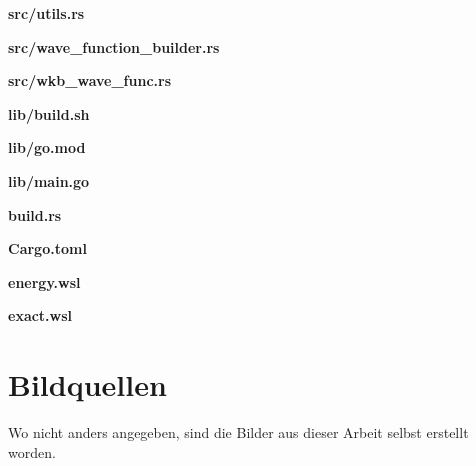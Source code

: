 \documentclass[11pt,DIV=10,final]{scrreprt} %
\begin{document}
\begin{appendix}
\vspace*{3ex}
{\noindent \large \bfseries src/utils.rs}


\vspace*{3ex}
{\noindent \large \bfseries src/wave\_function\_builder.rs}


\vspace*{3ex}
{\noindent \large \bfseries src/wkb\_wave\_func.rs}


\vspace*{3ex}
{\noindent \large \bfseries lib/build.sh}


\vspace*{3ex}
{\noindent \large \bfseries lib/go.mod}


\vspace*{3ex}
{\noindent \large \bfseries lib/main.go}


\vspace*{3ex}
{\noindent \large \bfseries build.rs}


\vspace*{3ex}
{\noindent \large \bfseries Cargo.toml}


\vspace*{3ex}
{\noindent \large \bfseries energy.wsl}


\vspace*{3ex}
{\noindent \large \bfseries exact.wsl}


\end{appendix}
\chapter*{Bildquellen}
%
Wo nicht anders angegeben, sind die Bilder aus dieser Arbeit selbst erstellt worden.
%



%
\end{document}
